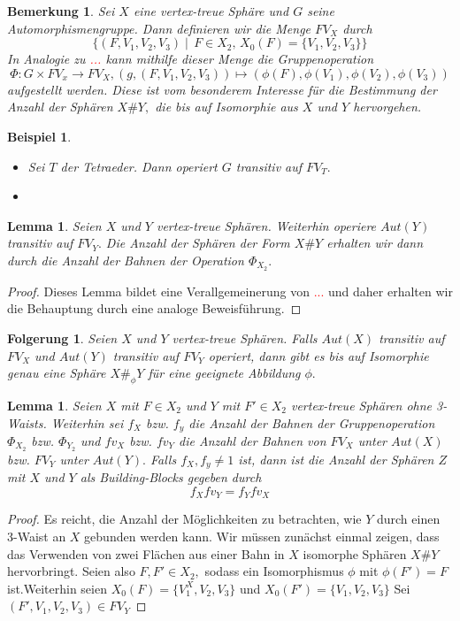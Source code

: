 \documentclass[12pt,titlepage,twoside,cleardoublepage]{article}
\theoremstyle{nummermitklammern}
\newtheorem{lemma}[temp]{Lemma}
\newtheorem{folgerung}[temp]{Folgerung}
\newtheorem{bsp}[temp]{Beispiel}
\newtheorem{bemerkung}[temp]{Bemerkung}
\newtheorem{lemma}[zahl]{Lemma}
\newtheorem{folgerung}[zahl]{Folgerung}
\newtheorem{bsp}[zahl]{Beispiel}
\newtheorem{bemerkung}[zahl]{Bemerkung}
\numberwithin{equation}{section}
\begin{document}
\begin{bemerkung}
Sei $X$ eine vertex-treue Sphäre und $G$ seine Automorphismengruppe. Dann definieren wir die Menge $FV_X$ durch   
\[
\{(F,V_1,V_2,V_3)\mid \, F\in X_2,\, X_0(F)=\{V_1,V_2,V_3\}\}
\]
In Analogie zu \textcolor{red}{...} kann mithilfe dieser Menge die Gruppenoperation
\[
\Phi:G\times FV_x\to FV_X,(g,(F,V_1,V_2,V_3))\mapsto (\phi(F),\phi(V_1),\phi(V_2),\phi(V_3))
\] 
aufgestellt werden. Diese ist vom besonderem Interesse für die Bestimmung der Anzahl der Sphären $X\#Y,$ die bis auf Isomorphie aus $X$ und $Y$ hervorgehen.
\end{bemerkung}
\begin{bsp}
\begin{itemize}
\item 
Sei $T$ der Tetraeder. Dann operiert $G$ transitiv auf $FV_T.$
\item

\end{itemize}
\end{bsp}
\begin{lemma}
Seien $X$ und $Y$ vertex-treue Sphären. Weiterhin operiere $Aut(Y)$ transitiv auf $FV_Y.$ Die Anzahl der Sphären der Form $X\#Y$ erhalten wir dann durch die Anzahl der Bahnen der Operation $ \Phi_{X_2}.$ 
\end{lemma}
\begin{proof}
Dieses Lemma bildet eine Verallgemeinerung von \textcolor{red}{...} und daher erhalten wir die Behauptung durch eine analoge Beweisführung.
\end{proof}
\begin{folgerung}
Seien $X$ und $Y$ vertex-treue Sphären. Falls $Aut(X)$ transitiv auf $FV_X$ und $Aut(Y)$ transitiv auf $FV_Y$ operiert, dann gibt es bis auf Isomorphie genau eine Sphäre $X\#_{\phi}Y$ für eine geeignete Abbildung $\phi.$   
\end{folgerung}
\begin{lemma}
Seien $X$ mit $F\in X_2$ und $Y$ mit $F'\in X_2$ vertex-treue Sphären ohne 3-Waists. Weiterhin sei $f_X$ bzw. $f_y$ die Anzahl der Bahnen der Gruppenoperation $\Phi_{X_2}$ bzw. $\Phi_{Y_2}$ und $fv_X$ bzw. $fv_Y$ die Anzahl der Bahnen von $FV_X$ unter $Aut(X)$ bzw.  $FV_Y$ unter $Aut(Y).$ Falls $f_X,f_y\neq 1$ ist, dann ist die Anzahl der Sphären $Z$ mit $X$ und $Y$ als Building-Blocks gegeben durch 
\[
f_Xfv_Y=f_Yfv_X
\]  
\end{lemma}
\begin{proof}
Es reicht, die Anzahl der Möglichkeiten zu betrachten, wie $Y$ durch einen 3-Waist an $X$ gebunden werden kann. 
Wir müssen zunächst einmal zeigen, dass das Verwenden von zwei Flächen aus einer Bahn in $X$ isomorphe Sphären $X\# Y$ hervorbringt.
Seien also $F,F'\in X_2,$ sodass ein Isomorphismus $\phi$ mit $\phi(F')=F$ ist.Weiterhin seien $X_0(F)=\{V^X_1,V_2,V_3\}$ und $X_0(F')=\{V_1,V_2,V_3\}$  Sei $(F',V_1,V_2,V_3)\in FV_Y$  
\end{proof}
\end{document}
